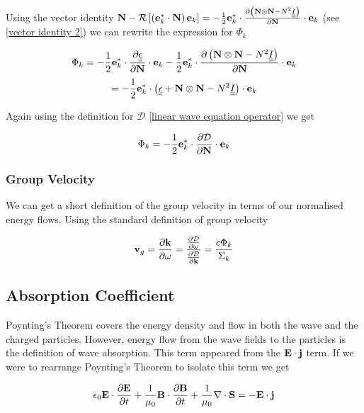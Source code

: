 Using the vector identity $\textbf{N} - \mathcal{R} \left[ \left( \textbf{e}_k^* \cdot \textbf{N} \right) \textbf{e}_k \right] = - \frac{1}{2} \textbf{e}_k^* \cdot \frac{\partial \left( \textbf{N} \otimes \textbf{N} - N^2 \underline{\underline{I}} \right)}{\partial \textbf{N}} \cdot \textbf{e}_k$ (see \ref{vector identity 2}) we can rewrite the expression for $\Phi_k$

\begin{equation*}
	\Phi_k = - \frac{1}{2} \textbf{e}_k^* \cdot \frac{\partial \underline{\underline{\epsilon}}}{\partial \textbf{N}} \cdot \textbf{e}_k - \frac{1}{2} \textbf{e}_k^* \cdot \frac{\partial \left( \textbf{N} \otimes \textbf{N} - N^2 \underline{\underline{I}} \right)}{\partial \textbf{N}} \cdot \textbf{e}_k
\end{equation*}
\begin{equation}
	= - \frac{1}{2} \textbf{e}_k^* \cdot \left( \underline{\underline{\epsilon}} + \textbf{N} \otimes \textbf{N} - N^2 \underline{\underline{I}} \right) \cdot \textbf{e}_k
\end{equation}

Again using the definition for $\mathcal{D}$ \eqref{linear wave equation operator} we get

\begin{equation} \label{Normalised Wave Energy Flow}
	\Phi_k = - \frac{1}{2} \textbf{e}_k^* \cdot \frac{\partial \mathcal{D}}{\partial \textbf{N}} \cdot \textbf{e}_k
\end{equation}

\subsubsection{Group Velocity}
We can get a short definition of the group velocity in terms of our normalised energy flows. Using the standard definition of group velocity

\begin{equation}
	\textbf{v}_g = \frac{\partial \textbf{k}}{\partial \omega} = \frac{\frac{\partial \mathcal{D}}{\partial \omega}}{\frac{\partial \mathcal{D}}{\partial \textbf{k}}} = \frac{c \Phi_k}{\Sigma_k}
\end{equation}

\subsection{Absorption Coefficient}
Poynting's Theorem covers the energy density and flow in both the wave and the charged particles. However, energy flow from the wave fields to the particles is the definition of wave absorption. This term appeared from the $\textbf{E} \cdot \textbf{j}$ term. If we were to rearrange Poynting's Theorem to isolate this term we get

\begin{equation}
	\epsilon_0 \textbf{E} \cdot \frac{\partial \textbf{E}}{\partial t} + \frac{1}{\mu_0} \textbf{B} \cdot \frac{\partial \textbf{B}}{\partial t} + \frac{1}{\mu_0} \nabla \cdot \textbf{S} = - \textbf{E} \cdot \textbf{j}
\end{equation}

